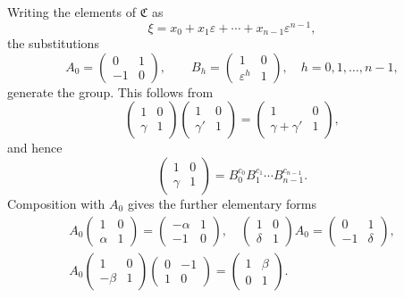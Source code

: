 \documentclass[11pt]{article}
\begin{document}
Writing the elements of $\mathfrak C$ as
\begin{equation}
 \xi=x_0+x_1\varepsilon+\cdots+x_{n-1}\varepsilon^{n-1}, \tag{7}
\end{equation}
the substitutions
\begin{equation}
 A_0=\begin{pmatrix}0&1\\-1&0\end{pmatrix},\qquad
 B_h=\begin{pmatrix}1&0\\\varepsilon^h&1\end{pmatrix},
 \quad h=0,1,\ldots,n-1, \tag{8}
\end{equation}
generate the group. This follows from
\[
 \begin{pmatrix}1&0\\ \gamma&1\end{pmatrix}
 \begin{pmatrix}1&0\\ \gamma'&1\end{pmatrix}
 =
 \begin{pmatrix}1&0\\ \gamma+\gamma'&1\end{pmatrix},
\]
and hence
\begin{equation}
 \begin{pmatrix}1&0\\ \gamma&1\end{pmatrix}
 =B_0^{c_0}B_1^{c_1}\cdots B_{n-1}^{c_{n-1}}. \tag{9}
\end{equation}
Composition with $A_0$ gives the further elementary forms
\begin{equation}
\begin{gathered}
 A_0\begin{pmatrix}1&0\\ \alpha&1\end{pmatrix}
 =\begin{pmatrix}-\alpha&1\\-1&0\end{pmatrix},\quad
 \begin{pmatrix}1&0\\ \delta&1\end{pmatrix}A_0
 =\begin{pmatrix}0&1\\-1&\delta\end{pmatrix},\\
 A_0\begin{pmatrix}1&0\\ -\beta&1\end{pmatrix}
 \begin{pmatrix}0&-1\\1&0\end{pmatrix}
 =\begin{pmatrix}1&\beta\\0&1\end{pmatrix}.
\end{gathered} \tag{10}
\end{equation}
\end{document}
